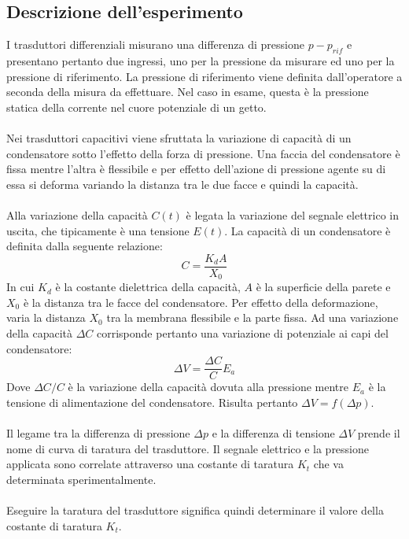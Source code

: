 \subsection{Descrizione dell'esperimento}
I trasduttori differenziali misurano una differenza di pressione $p-p_{rif}$ e presentano pertanto due ingressi, uno per la pressione da misurare ed uno per la pressione di riferimento. La pressione di riferimento viene definita dall'operatore a seconda della misura da effettuare. Nel caso in esame, questa è la pressione statica della corrente nel cuore potenziale di un getto.\\\\
Nei trasduttori capacitivi viene sfruttata la variazione di capacità di un condensatore sotto l'effetto della forza di pressione. Una faccia del condensatore è fissa mentre l'altra è flessibile e per effetto dell'azione di pressione agente su di essa si deforma variando la distanza tra le due facce e quindi la capacità.\\\\
Alla variazione della capacità $C(t)$ è legata la variazione del segnale elettrico in uscita, che tipicamente è una tensione $E(t)$. La capacità di un condensatore è definita dalla seguente relazione:
\begin{equation*}
    C = \frac{K_d A}{X_0}
\end{equation*}
In cui $K_d$ è la costante dielettrica della capacità, $A$ è la superficie della parete e $X_0$ è la distanza tra le facce del condensatore. Per effetto della deformazione, varia la distanza $X_0$ tra la membrana flessibile e la parte fissa. Ad una variazione della capacità $\Delta C$ corrisponde pertanto una variazione di potenziale ai capi del condensatore:
\begin{equation*}
    \Delta V = \frac{\Delta C}{C}E_a
\end{equation*}
Dove $\Delta C/C$ è la variazione della capacità dovuta alla pressione mentre $E_a$ è la tensione di alimentazione del condensatore. Risulta pertanto $\Delta V = f(\Delta p)$.\\\\
Il legame tra la differenza di pressione $\Delta p$ e la differenza di tensione $\Delta V$ prende il nome di curva di taratura del trasduttore. Il segnale elettrico e la pressione applicata sono correlate attraverso una costante di taratura $K_t$ che va determinata sperimentalmente.\\\\
Eseguire la taratura del trasduttore significa quindi determinare il valore della costante di taratura $K_t$.

